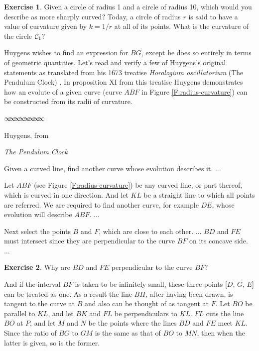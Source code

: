 \documentclass[12pt]{article}
\theoremstyle{definition}
\newtheorem{exercise}{Exercise}[section]
\newcommand{\sep}{\vspace{-3pt} \begin{center}
{\mathversion{normal}
$\infty \mspace{-5.5mu} \infty \mspace{-5.5mu}
\infty \mspace{-5.5mu} \infty \mspace{-5.5mu}
\infty \mspace{-5.5mu} \infty \mspace{-5.5mu}
\infty \mspace{-5.5mu} \infty$}
\end{center} \vspace{-3pt}}
\begin{document}
\begin{exercise}  \label{E:circle}
Given a circle of radius 1 and a circle of radius 10, which would
you describe as more sharply curved?  Today, a circle of radius
$r$ is said to have a value of curvature given by $k = 1/r$ at all of
its points.  What is the curvature of the circle ${\cal{C}}_1$?
\end{exercise}

Huygens wishes to find an expression for $BG$, except he does so
entirely in terms of geometric quantities.   Let's
read and verify a few of Huygens's original statements as translated
from his 1673 treatise {\em Horologium oscillatorium} (The Pendulum
Clock) \cite{Blackwell, Huygens}. In proposition XI from this treatise 
Huygens demonstrates how an evolute of a given curve (curve $ABF$ in
Figure \ref{F:radius-curvature}) can be constructed from its radii of curvature.

\bigskip
\sep

\begin{center}
Huygens, from

\smallskip
{\em{The Pendulum Clock}}

\bigskip
{}
\end{center}
\smallskip
{\sf Given a curved line, find another curve whose evolution describes it.
 $\ldots$

Let $ABF$ (see Figure \ref{F:radius-curvature}) be any curved line, 
or part thereof, which is
curved in one direction.   And let $KL$ be a straight line to which
all points are referred.  We are required to find another curve, for
example $DE$, whose evolution will describe $ABF$. $\ldots$

Next select the points $B$ and $F$, which are close to each
other. $\ldots$ 
$BD$ and $FE$ must intersect since they are perpendicular to the curve
$BF$ on its concave side.  $\ldots$}

\begin{exercise} \label{E:perpendicular}
 Why are $BD$ and $FE$ perpendicular to the curve $BF$?
\end{exercise}

{\sf And if the interval $BF$ is taken to be infinitely small, these three
points [$D, \, G, \, E$] can be treated as one.  
As a result the line $BH$, after having
been drawn, is tangent to the curve at $B$ and also can be thought of
as tangent at $F$.  Let $BO$ be parallel to $KL$, and let $BK$ and
$FL$ be perpendiculars to $KL$.  $FL$ cuts the line $BO$ at $P$, and
let $M$ and $N$ be the points where the lines $BD$ and $FE$ meet $KL$.
Since the ratio of $BG$ to $GM$ is the same as that of $BO$ to $MN$,
then when the latter is given, so is the former.}
\end{document}
